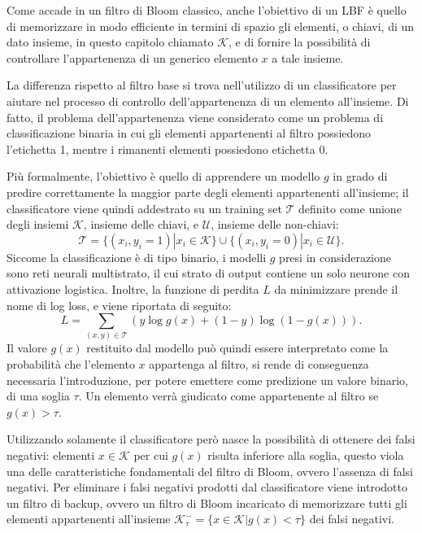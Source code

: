 \documentclass[../../main.tex]{subfiles}
\begin{document}
    Come accade in un filtro di Bloom classico, anche l'obiettivo di un LBF è quello di memorizzare in modo efficiente in termini di spazio gli elementi, o chiavi, di un dato insieme, in questo capitolo chiamato $\mathcal{K}$, e di fornire la possibilità di controllare l'appartenenza di un generico elemento $x$ a tale insieme.

    La differenza rispetto al filtro base si trova nell'utilizzo di un classificatore per aiutare nel processo di controllo dell'appartenenza di un elemento all'insieme. Di fatto, il problema dell'appartenenza viene considerato come un problema di classificazione binaria in cui gli elementi appartenenti al filtro possiedono l'etichetta 1, mentre i rimanenti elementi possiedono etichetta 0.

    Più formalmente, l'obiettivo è quello di apprendere un modello $g$ in grado di predire correttamente la maggior parte degli elementi appartenenti all'insieme; il classificatore viene quindi addestrato su un training set $\mathcal{T}$ definito come unione degli insiemi $\mathcal{K}$, insieme delle chiavi, e $\mathcal{U}$, insieme delle non-chiavi:
    \begin{equation}
        \mathcal{T} = \{(x_i, y_i = 1) | x_i \in \mathcal{K}\} \cup \{(x_i, y_i = 0) | x_i \in \mathcal{U}\}.
    \end{equation}
    Siccome la classificazione è di tipo binario, i modelli $g$ presi in considerazione sono reti neurali multistrato, il cui strato di output contiene un solo neurone con attivazione logistica. Inoltre, la funzione di perdita $L$ da minimizzare prende il nome di log loss, e viene riportata di seguito:
    \begin{equation}
        L = \sum_{(x,y) \in \mathcal{T}}\left(y \log g(x) + (1 - y) \log(1 - g(x))\right).
        \label{eqn:logloss}
    \end{equation}
    Il valore $g(x)$ restituito dal modello può quindi essere interpretato come la probabilità che l'elemento $x$ appartenga al filtro, si rende di conseguenza necessaria l'introduzione, per potere emettere come predizione un valore binario, di una soglia $\tau$. Un elemento verrà giudicato come appartenente al filtro se $g(x) > \tau$.
    
    Utilizzando solamente il classificatore però nasce la possibilità di ottenere dei falsi negativi: elementi $x \in \mathcal{K}$ per cui $g(x)$ risulta inferiore alla soglia, questo viola una delle caratteristiche fondamentali del filtro di Bloom, ovvero l'assenza di falsi negativi. Per eliminare i falsi negativi prodotti dal classificatore viene introdotto un filtro di backup, ovvero un filtro di Bloom incaricato di memorizzare tutti gli elementi appartenenti all'insieme $\mathcal{K}_{\tau}^- = \{x \in \mathcal{K} | g(x) < \tau\}$ dei falsi negativi.
\end{document}
